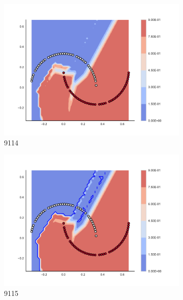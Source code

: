 \begin{figure}[h]
\begin{subfigure}[b]{0.09\textwidth}
    \includegraphics[clip, trim=2.35cm 1.75cm 4.5cm 0cm,width=\textwidth]{img/convergence/9114.pdf}
    \caption{9114}
    \label{fig:convergence_9114}
\end{subfigure}
%
\begin{subfigure}[b]{0.09\textwidth}
    \includegraphics[clip, trim=2.35cm 1.75cm 4.5cm 0cm,width=\textwidth]{img/convergence/9115.pdf}
    \caption{9115}
    \label{fig:convergence_9115}
\end{subfigure}
%
\begin{subfigure}[b]{0.09\textwidth}

\end{subfigure}
\end{figure}
